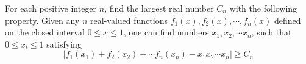 For each positive integer $n$, find the largest real number $C_n$ with the following property. Given any $n$ real-valued functions $f_1(x), f_2(x), \cdots, f_n(x)$ defined on the closed interval $0 \le x \le 1$, one can find numbers $x_1, x_2, \cdots x_n$, such that $0 \le x_i \le 1$ satisfying \[|f_1(x_1)+f_2(x_2)+\cdots f_n(x_n)-x_1x_2\cdots x_n| \ge C_n\]
